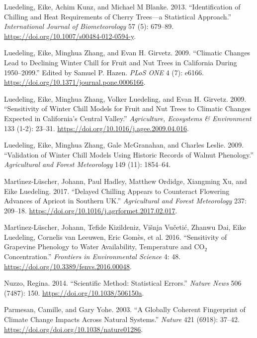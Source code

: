 \documentclass[
]{book}
\begin{document}
\leavevmode\hypertarget{ref-luedeling2013identification}{}%
Luedeling, Eike, Achim Kunz, and Michael M Blanke. 2013. ``Identification of Chilling and Heat Requirements of Cherry Trees---a Statistical Approach.'' \emph{International Journal of Biometeorology} 57 (5): 679--89. \url{https://doi.org/10.1007/s00484-012-0594-y}.

\leavevmode\hypertarget{ref-luedeling_climatic_2009}{}%
Luedeling, Eike, Minghua Zhang, and Evan H. Girvetz. 2009. ``Climatic Changes Lead to Declining Winter Chill for Fruit and Nut Trees in California During 1950--2099.'' Edited by Samuel P. Hazen. \emph{PLoS ONE} 4 (7): e6166. \url{https://doi.org/10.1371/journal.pone.0006166}.

\leavevmode\hypertarget{ref-luedeling_sensitivity_2009}{}%
Luedeling, Eike, Minghua Zhang, Volker Luedeling, and Evan H. Girvetz. 2009. ``Sensitivity of Winter Chill Models for Fruit and Nut Trees to Climatic Changes Expected in California's Central Valley.'' \emph{Agriculture, Ecosystems \& Environment} 133 (1-2): 23--31. \url{https://doi.org/10.1016/j.agee.2009.04.016}.

\leavevmode\hypertarget{ref-luedeling2009validation}{}%
Luedeling, Eike, Minghua Zhang, Gale McGranahan, and Charles Leslie. 2009. ``Validation of Winter Chill Models Using Historic Records of Walnut Phenology.'' \emph{Agricultural and Forest Meteorology} 149 (11): 1854--64.

\leavevmode\hypertarget{ref-martinez2017delayed}{}%
Martı́nez-Lüscher, Johann, Paul Hadley, Matthew Ordidge, Xiangming Xu, and Eike Luedeling. 2017. ``Delayed Chilling Appears to Counteract Flowering Advances of Apricot in Southern UK.'' \emph{Agricultural and Forest Meteorology} 237: 209--18. \url{https://doi.org/10.1016/j.agrformet.2017.02.017}.

\leavevmode\hypertarget{ref-martinez2016sensitivity}{}%
Martı́nez-Lüscher, Johann, Tefide Kizildeniz, Višnja Vučetić, Zhanwu Dai, Eike Luedeling, Cornelis van Leeuwen, Eric Gomès, et al. 2016. ``Sensitivity of Grapevine Phenology to Water Availability, Temperature and CO\(_2\) Concentration.'' \emph{Frontiers in Environmental Science} 4: 48. \url{https://doi.org/10.3389/fenvs.2016.00048}.

\leavevmode\hypertarget{ref-nuzzo2014scientific}{}%
Nuzzo, Regina. 2014. ``Scientific Method: Statistical Errors.'' \emph{Nature News} 506 (7487): 150. \url{https://doi.org/10.1038/506150a}.

\leavevmode\hypertarget{ref-parmesan2003globally}{}%
Parmesan, Camille, and Gary Yohe. 2003. ``A Globally Coherent Fingerprint of Climate Change Impacts Across Natural Systems.'' \emph{Nature} 421 (6918): 37--42. \url{https://doi.org/doi.org/10.1038/nature01286}.
\end{document}
